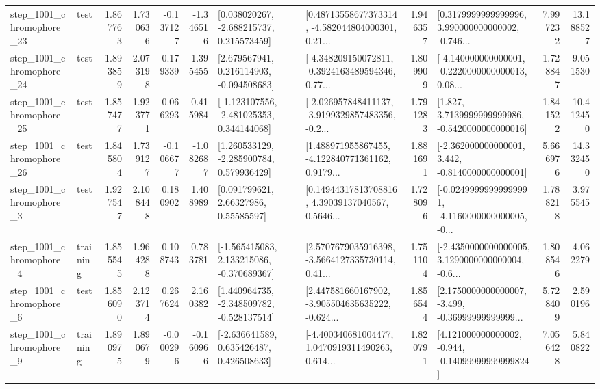 \begin{tabular}{llrrrrllrlrr}
 step\_1001\_chromophore\_23 &      test &      1.867763 &    1.730636 &     -0.137127 & -1.346516 &    [0.038020267, -2.688215737, 0.215573459] &  [0.48713558677373314, -4.582044804000301, 0.21... &       1.946357 &  [0.3179999999999996, 3.990000000000002, -0.746... &            7.997232 &         13.188527 \\
 step\_1001\_chromophore\_24 &      test &      1.893859 &    2.073198 &      0.179339 &  1.395455 &    [2.679567941, 0.216114903, -0.094508683] &  [-4.348209150072811, -0.3924163489594346, 0.77... &       1.809909 &  [-4.140000000000001, -0.2220000000000013, 0.08... &            1.728847 &          9.051530 \\
 step\_1001\_chromophore\_25 &      test &      1.857477 &    1.923771 &      0.066293 &  0.415984 &   [-1.123107556, -2.481025353, 0.344144068] &  [-2.026957848411137, -3.9199329857483356, -0.2... &       1.791283 &   [1.827, 3.7139999999999986, -0.5420000000000016] &            1.841522 &         10.412450 \\
 step\_1001\_chromophore\_26 &      test &      1.845804 &    1.739127 &     -0.106677 & -1.082687 &    [1.260533129, -2.285900784, 0.579936429] &  [1.488971955867455, -4.122840771361162, 0.9179... &       1.881691 &   [-2.362000000000001, 3.442, -0.8140000000000001] &            5.666976 &         14.332450 \\
  step\_1001\_chromophore\_3 &      test &      1.927547 &    2.108448 &      0.180902 &  1.408989 &       [0.091799621, 2.66327986, 0.55585597] &  [0.14944317813708816, 4.39039137040567, 0.5646... &       1.728096 &  [-0.02499999999999991, -4.1160000000000005, -0... &            1.788218 &          3.975545 \\
  step\_1001\_chromophore\_4 &  training &      1.855545 &    1.964288 &      0.108743 &  0.783781 &   [-1.565415083, 2.133215086, -0.370689367] &  [2.5707679035916398, -3.5664127335730114, 0.41... &       1.751104 &  [-2.4350000000000005, 3.1290000000000004, -0.6... &            1.808546 &          4.062279 \\
  step\_1001\_chromophore\_6 &      test &      1.856090 &    2.123714 &      0.267624 &  2.160382 &   [1.440964735, -2.348509782, -0.528137514] &  [2.447581660167902, -3.905504635635222, -0.624... &       1.856544 &  [2.1750000000000007, -3.499, -0.36999999999999... &            5.728409 &          2.590196 \\
  step\_1001\_chromophore\_9 &  training &      1.890975 &    1.890679 &     -0.000296 & -0.160966 &    [-2.636641589, 0.635426487, 0.426508633] &  [-4.400340681004477, 1.0470919311490263, 0.614... &       1.820791 &  [4.121000000000002, -0.944, -0.14099999999999824] &            7.056428 &          5.840822 \\

\end{tabular}
